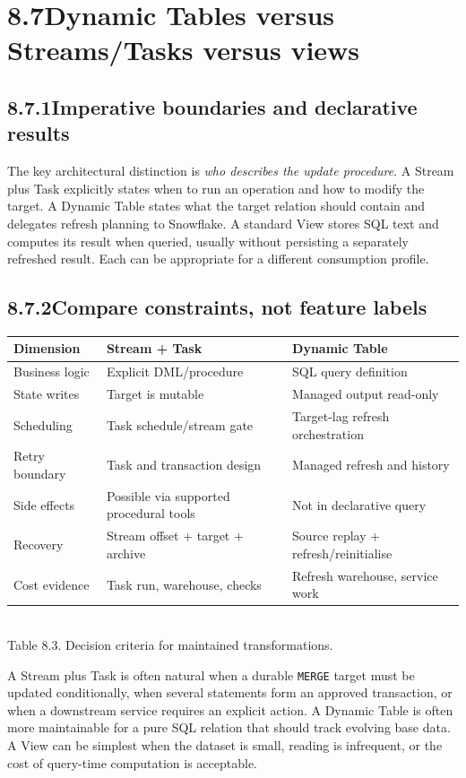 \documentclass[11pt,twoside]{article}
\newcommand{\topic}[2]{\subsection*{#1\quad #2}}
\begin{document}
\section*{8.7\quad Dynamic Tables versus Streams/Tasks versus views}
\topic{8.7.1}{Imperative boundaries and declarative results}
The key architectural distinction is \emph{who describes the update procedure}. A Stream plus Task explicitly states when to run an operation and how to modify the target. A Dynamic Table states what the target relation should contain and delegates refresh planning to Snowflake. A standard View stores SQL text and computes its result when queried, usually without persisting a separately refreshed result. Each can be appropriate for a different consumption profile.
\topic{8.7.2}{Compare constraints, not feature labels}
\begin{center}\renewcommand{\arraystretch}{1.13}\begin{tabularx}{\linewidth}{@{}p{26mm}X X@{}}\toprule
\textbf{Dimension}&\textbf{Stream + Task}&\textbf{Dynamic Table}\\\midrule
Business logic&Explicit DML/procedure&SQL query definition\\
State writes&Target is mutable&Managed output read-only\\
Scheduling&Task schedule/stream gate&Target-lag refresh orchestration\\
Retry boundary&Task and transaction design&Managed refresh and history\\
Side effects&Possible via supported procedural tools&Not in declarative query\\
Recovery&Stream offset + target + archive&Source replay + refresh/reinitialise\\
Cost evidence&Task run, warehouse, checks&Refresh warehouse, service work\\\bottomrule
\end{tabularx}\\{\fontsize{8}{9.5}\selectfont\color{inkgray}Table 8.3. Decision criteria for maintained transformations.}\end{center}
A Stream plus Task is often natural when a durable \texttt{MERGE} target must be updated conditionally, when several statements form an approved transaction, or when a downstream service requires an explicit action. A Dynamic Table is often more maintainable for a pure SQL relation that should track evolving base data. A View can be simplest when the dataset is small, reading is infrequent, or the cost of query-time computation is acceptable.
\end{document}
